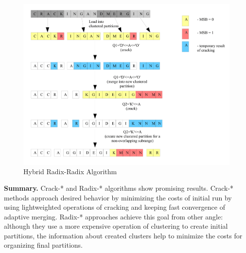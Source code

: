 \documentclass[10pt, conference, compsocconf]{IEEEtran}
\begin{document}
\begin{figure}[h]
\centering
\includegraphics[width=\columnwidth]{hrr.png}
\caption{Hybrid Radix-Radix Algorithm}
\end{figure}

\textbf{Summary.} Crack-* and Radix-* algorithms show promising results. Crack-* methods approach desired behavior by minimizing the costs of initial run by using lightweighted operations of cracking and keeping fast convergence of adaptive merging. Radix-* approaches achieve this goal from other angle: although they use a more expensive operation of clustering to create initial partitions, the information about created clusters help to minimize the costs for organizing final partitions.
\end{document}
